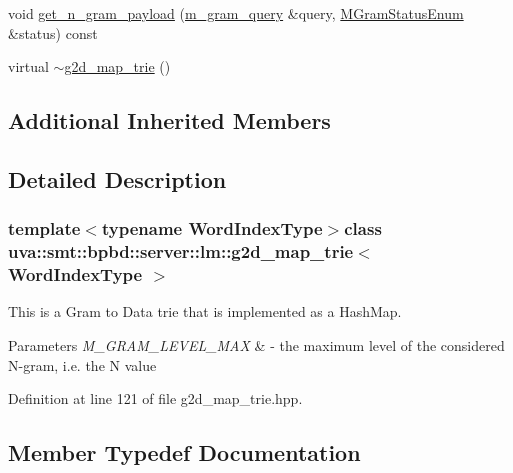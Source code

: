 \begin{DoxyCompactItemize}
\item 
void \hyperlink{classuva_1_1smt_1_1bpbd_1_1server_1_1lm_1_1g2d__map__trie_a854a78542f53a1ece062f38280b0810a}{get\+\_\+n\+\_\+gram\+\_\+payload} (\hyperlink{classuva_1_1smt_1_1bpbd_1_1server_1_1lm_1_1m__gram__query}{m\+\_\+gram\+\_\+query} \&query, \hyperlink{namespaceuva_1_1smt_1_1bpbd_1_1server_1_1lm_ab9b3e7382b561dcb8abcd6b55e9b796a}{M\+Gram\+Status\+Enum} \&status) const 
\item 
virtual \hyperlink{classuva_1_1smt_1_1bpbd_1_1server_1_1lm_1_1g2d__map__trie_ab4658b58f1dd70a4249928986d0f81b4}{$\sim$g2d\+\_\+map\+\_\+trie} ()
\end{DoxyCompactItemize}
\subsection*{Additional Inherited Members}


\subsection{Detailed Description}
\subsubsection*{template$<$typename Word\+Index\+Type$>$class uva\+::smt\+::bpbd\+::server\+::lm\+::g2d\+\_\+map\+\_\+trie$<$ Word\+Index\+Type $>$}

This is a Gram to Data trie that is implemented as a Hash\+Map. 
\begin{DoxyParams}{Parameters}
{\em M\+\_\+\+G\+R\+A\+M\+\_\+\+L\+E\+V\+E\+L\+\_\+\+M\+A\+X} & -\/ the maximum level of the considered N-\/gram, i.\+e. the N value \\
\hline
\end{DoxyParams}


Definition at line 121 of file g2d\+\_\+map\+\_\+trie.\+hpp.



\subsection{Member Typedef Documentation}
\hypertarget{classuva_1_1smt_1_1bpbd_1_1server_1_1lm_1_1g2d__map__trie_a2b15dbbb98391a04427bc3d651816654}{}
